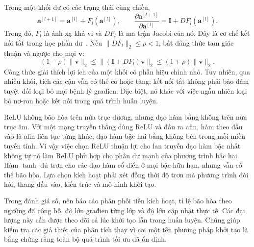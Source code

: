 Trong một khối dư có các trạng thái cùng chiều,
\begin{equation}
 \mathbf a^{[l+1]}=\mathbf a^{[l]}+F_l(\mathbf a^{[l]}),\qquad
 \frac{\partial\mathbf a^{[l+1]}}{\partial\mathbf a^{[l]}}
 =\mathbf I+DF_l(\mathbf a^{[l]}).
 \label{kt:eq:residual-block}
\end{equation}
Trong đó, $F_l$ là ánh xạ khả vi và $DF_l$ là ma trận Jacobi của
nó. Đây là cơ chế kết nối tắt trong học phần dư~\cite{he2016}.
Nếu $\|DF_l\|_2\leq\rho<1$, bất đẳng thức tam giác thuận và
ngược cho mọi $\mathbf v$:
\begin{equation}
 (1-\rho)\|\mathbf v\|_2
 \leq\|(\mathbf I+DF_l)\mathbf v\|_2
 \leq(1+\rho)\|\mathbf v\|_2.
 \label{kt:eq:residual-bound}
\end{equation}
Công thức giải thích lợi ích của một khối có phần hiệu chỉnh nhỏ.
Tuy nhiên, qua nhiều khối, tích các cận vẫn có thể co hoặc tăng;
kết nối tắt không phải bảo đảm tuyệt đối loại bỏ mọi bệnh lý
građien. Đặc biệt, nó khác với việc ngẫu nhiên loại bỏ nơ-ron hoặc
kết nối trong quá trình huấn luyện.

ReLU không bão hòa trên nửa trục dương, nhưng đạo hàm bằng không
trên nửa trục âm. Với một mạng truyền thẳng dùng ReLU và đầu ra
afin, hàm theo đầu vào là afin liên tục từng khúc; đạo hàm bậc
hai bằng không bên trong mỗi miền tuyến tính. Vì vậy việc chọn
ReLU thuận lợi cho lan truyền đạo hàm bậc nhất không tự nó làm
ReLU phù hợp cho phần dư mạnh của phương trình bậc hai.
Hàm $\tanh$ đủ trơn cho các đạo hàm cổ điển ở mọi bậc hữu hạn,
nhưng vẫn có thể bão hòa. Lựa chọn kích hoạt phải xét đồng thời
độ trơn mà phương trình đòi hỏi, thang đầu vào, kiến trúc và mô
hình khởi tạo.

Trong đánh giá số, nên báo cáo phân phối tiền kích hoạt, tỉ lệ
bão hòa theo ngưỡng đã công bố, độ lớn građien từng lớp và độ
lớn cập nhật thực tế. Các đại lượng này cần được theo dõi cả lúc
khởi tạo lẫn trong huấn luyện. Chúng giúp kiểm tra các giả thiết
của phân tích thay vì coi một tên phương pháp khởi tạo là bằng
chứng rằng toàn bộ quá trình tối ưu đã ổn định.
